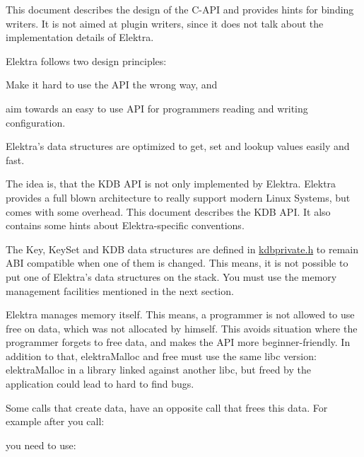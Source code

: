 This document describes the design of the C-\/\+A\+PI and provides hints for binding writers. It is not aimed at plugin writers, since it does not talk about the implementation details of Elektra.

Elektra follows two design principles\+:


\begin{DoxyEnumerate}
\item Make it hard to use the A\+PI the wrong way, and
\item aim towards an easy to use A\+PI for programmers reading and writing configuration.
\end{DoxyEnumerate}

Elektra’s data structures are optimized to get, set and lookup values easily and fast.

The idea is, that the K\+DB A\+PI is not only implemented by Elektra. Elektra provides a full blown architecture to really support modern Linux Systems, but comes with some overhead. This document describes the {\ttfamily K\+DB} A\+PI. It also contains some hints about Elektra-\/specific conventions.

The {\ttfamily Key}, {\ttfamily Key\+Set} and {\ttfamily K\+DB} data structures are defined in {\ttfamily \mbox{\hyperlink{kdbprivate_8h}{kdbprivate.\+h}}} to remain A\+BI compatible when one of them is changed. This means, it is not possible to put one of Elektra’s data structures on the stack. You must use the memory management facilities mentioned in the next section.

Elektra manages memory itself. This means, a programmer is not allowed to use free on data, which was not allocated by himself. This avoids situation where the programmer forgets to free data, and makes the A\+PI more beginner-\/friendly. In addition to that, {\ttfamily elektra\+Malloc} and {\ttfamily free} must use the same libc version\+: {\ttfamily elektra\+Malloc} in a library linked against another libc, but freed by the application could lead to hard to find bugs.

Some calls that create data, have an opposite call that frees this data. For example after you call\+:


\begin{DoxyCode}{0}
\end{DoxyCode}


you need to use\+:


\begin{DoxyCode}{0}
\end{DoxyCode}


